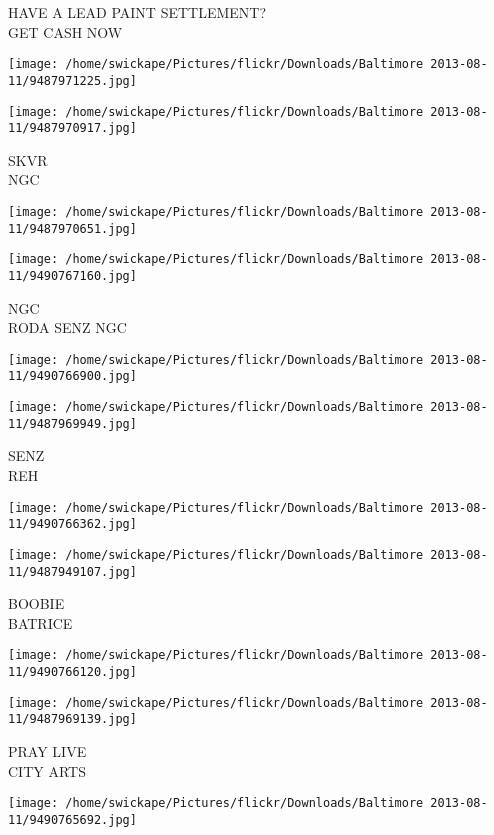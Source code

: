 \documentclass[10pt,letterpaper]{article}
\begin{document}
HAVE A LEAD PAINT SETTLEMENT?\\
GET CASH NOW
\pagebreak

\texttt{[image: /home/swickape/Pictures/flickr/Downloads/Baltimore 2013-08-11/9487971225.jpg]}

\vspace{0.25in}
\texttt{[image: /home/swickape/Pictures/flickr/Downloads/Baltimore 2013-08-11/9487970917.jpg]}

SKVR\\
NGC
\pagebreak

\texttt{[image: /home/swickape/Pictures/flickr/Downloads/Baltimore 2013-08-11/9487970651.jpg]}

\vspace{0.25in}
\texttt{[image: /home/swickape/Pictures/flickr/Downloads/Baltimore 2013-08-11/9490767160.jpg]}

NGC\\
RODA SENZ NGC
\pagebreak

\texttt{[image: /home/swickape/Pictures/flickr/Downloads/Baltimore 2013-08-11/9490766900.jpg]}

\vspace{0.25in}
\texttt{[image: /home/swickape/Pictures/flickr/Downloads/Baltimore 2013-08-11/9487969949.jpg]}

SENZ\\
REH
\pagebreak

\texttt{[image: /home/swickape/Pictures/flickr/Downloads/Baltimore 2013-08-11/9490766362.jpg]}

\vspace{0.25in}
\texttt{[image: /home/swickape/Pictures/flickr/Downloads/Baltimore 2013-08-11/9487949107.jpg]}

BOOBIE\\
BATRICE
\pagebreak

\texttt{[image: /home/swickape/Pictures/flickr/Downloads/Baltimore 2013-08-11/9490766120.jpg]}

\vspace{0.25in}
\texttt{[image: /home/swickape/Pictures/flickr/Downloads/Baltimore 2013-08-11/9487969139.jpg]}

PRAY LIVE\\
CITY ARTS
\pagebreak

\texttt{[image: /home/swickape/Pictures/flickr/Downloads/Baltimore 2013-08-11/9490765692.jpg]}
\end{document}
